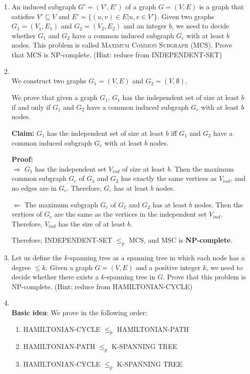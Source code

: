 \documentclass[12pt,a4paper]{article}
\makeatletter
\newtheorem*{solution}{Solution}
\theoremstyle{definition}
\renewenvironment{solution}[1][Solution] {\par\pushQED{\qed}\normalfont\topsep6\p@\@plus6\p@\relax\trivlist\item[\hskip\labelsep\bfseries#1\@addpunct{.}]\ignorespaces}{\popQED\endtrivlist\@endpefalse} \makeatother
\makeatother
\begin{document}
\begin{enumerate}
\begin{proof}
      ~\\
      By 3-SAT $\leq_p$ INDEPENDENT-SET  and INDEPENDENT-SET $\leq_p$ EXPERIMENTAL CUISINE,  we have:\begin{center}
      3-SAT  $\leq_p$ EXPERIMENTAL\ CUISINE. 
          \end{center} 
    \end{proof}
    \item An induced subgraph $G'=(V',E')$ of a graph $G=(V,E)$ is a graph that satisfies $V'\subseteq V$ and $E' =\{(u,v)\in E| u,v\in V'\}$. Given two graphs $G_1=(V_1,E_1)$ and $G_2=(V_2,E_2)$ and an integer $b$, we need to decide whether $G_1$ and $G_2$ have a common induced subgraph $G_c$ with at least $b$ nodes. This problem is called \textsc{Maximum Common Subgraph} (MCS). Prove that MCS is NP-complete. (Hint: reduce from \textsc{INDEPENDENT-SET})
\begin{solution}
    ~\\
    We construct two graphs $G_1=(V,E)$ and $G_2=(V,\emptyset)$.
    
    We prove that given a graph $G_1$, $G_1$ has the independent set of size at least $b$ if and only if $G_1$ and $G_2$ have a common induced subgraph $G_c$ with at least $b$ nodes.
    
    \textbf{Claim:} $G_1$ has the independent set of size at least $b$ iff $G_1$ and $G_2$ have a common induced subgraph $G_c$ with at least $b$ nodes.
    
    
    \textbf{Proof:}
    ~\\
    $\Rightarrow$ $G_1$ has the independent set $V_{ind}$ of size at least $b$. Then the maximum common subgraph $G_c$ of $G_1$ and $G_2$ has exactly the same vertices as $V_{ind}$, and no edges are in $G_c$. Therefore, $G_c$ has at least $b$ nodes.
    
    $\Leftarrow$ The maximum subgraph $G_c$ of $G_1$ and $G_2$ has at least $b$ nodes. Then the vertices of $G_c$ are the same as the vertices in the independent set $V_{ind}$. Therefore, $V_{ind}$ has the size of at least $b$.
    

Therefore, INDEPENDENT-SET $\leq_p$ MCS, and MSC is \textbf{NP-complete}.
    
\end{solution}
    \item Let us define the $k$-spanning tree as a spanning tree in which each node has a degree $\leqslant k$. Given a graph $G= (V,E)$ and a positive integer $k$, we need to decide whether there exists a $k$-spanning tree in $G$. Prove that this problem is NP-complete. (Hint: reduce from \textsc{HAMILTONIAN-CYCLE})
    \begin{solution}
    ~\\
        \textbf{Basic idea}: We prove in the following order: 
        \begin{enumerate}
            \item HAMILTONIAN-CYCLE $\leq_p$ HAMILTONIAN-PATH
            \item HAMILTONIAN-PATH $\leq_p$ K-SPANNING TREE
            \item HAMILTONIAN-CYCLE $\leq_p$ K-SPANNING TREE
        \end{enumerate}


\end{solution}
\end{enumerate}
\end{document}
